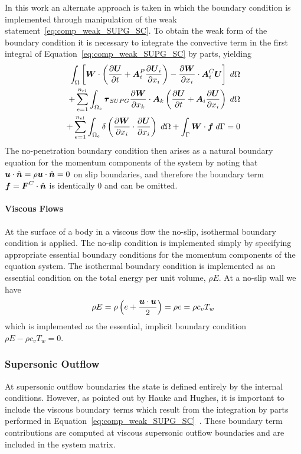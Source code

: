 In this work an alternate approach is taken in which the boundary condition is implemented through manipulation of the weak statement~\eqref{eq:comp_weak_SUPG_SC}. To obtain the weak form of the boundary condition it is necessary to integrate the convective term in the first integral of Equation~\eqref{eq:comp_weak_SUPG_SC} by parts, yielding
\begin{eqnarray}
  \label{eq:comp_weak_SUPG_SC_Euler_parts}
  \int_\Omega  \left[{\boldsymbol{W}}\cdot\left({\frac{\partial{{\boldsymbol{U}}}}{\partial{t}}} + {\boldsymbol{A}}^P_i{\frac{\partial{{\boldsymbol{U}}_i}}{\partial{x_i}}} \right)- {\frac{\partial{{\boldsymbol{W}}}}{\partial{x_i}}}\cdot{\boldsymbol{A}}^C_i{\boldsymbol{U}} \right] \; d\Omega \nonumber \\
  + \sum_{e=1}^{n_{el}} \int_{\Omega_e} {\boldsymbol{\tau}}_{SUPG} {\frac{\partial{{\boldsymbol{W}}}}{\partial{x_k}}}\cdot{\boldsymbol{A}}_k
  \left( {\frac{\partial{{\boldsymbol{U}}}}{\partial{t}}} + {\boldsymbol{A}}_i {\frac{\partial{{\boldsymbol{U}}}}{\partial{x_i}}} \right) \; d\Omega  \nonumber \\
  + \sum_{e=1}^{n_{el}} \int_{\Omega_e} \delta \left({\frac{\partial{{\boldsymbol{W}}}}{\partial{x_i}}}\cdot{\frac{\partial{{\boldsymbol{U}}}}{\partial{x_i}}}\right)\; d\Omega
   + \int_\Gamma {\boldsymbol{W}}\cdot{\boldsymbol{f}} \; d\Gamma = 0
\end{eqnarray}
The no-penetration boundary condition then arises as a natural boundary equation for the momentum components of the system by noting that ${\boldsymbol{u}}\cdot\hat{{\boldsymbol{n}}}= \rho {\boldsymbol{u}}\cdot\hat{{\boldsymbol{n}}}=0$ on slip boundaries, and therefore the boundary term ${\boldsymbol{f}}={\boldsymbol{F}}^C\cdot\hat{{\boldsymbol{n}}}$ is identically 0 and can be omitted.

\paragraph{Viscous Flows}
At the surface of a body in a viscous flow the no-slip, isothermal boundary condition is applied.  The no-slip condition is implemented simply by specifying appropriate essential boundary conditions for the momentum components of the equation system.  The isothermal boundary condition is implemented as an essential condition on the total energy per unit volume, $\rho E$. At a no-slip wall we have
\begin{equation*}
  \rho E = \rho \left(e + \frac{{\boldsymbol{u}}\cdot{\boldsymbol{u}}}{2}\right) = \rho e = \rho c_v T_w
\end{equation*}
which is implemented as the essential, implicit boundary condition $\rho E - \rho c_v T_w = 0$.

\subsubsection{Supersonic Outflow}

At supersonic outflow boundaries the state is defined entirely by the internal conditions.  However, as pointed out by Hauke and Hughes, it is important to include the viscous boundary terms which result from the integration by parts performed in Equation~\eqref{eq:comp_weak_SUPG_SC}~\cite{hauke_hughes_compressible_variables}.  These boundary term contributions are computed at viscous supersonic outflow boundaries and are included in the system matrix.

